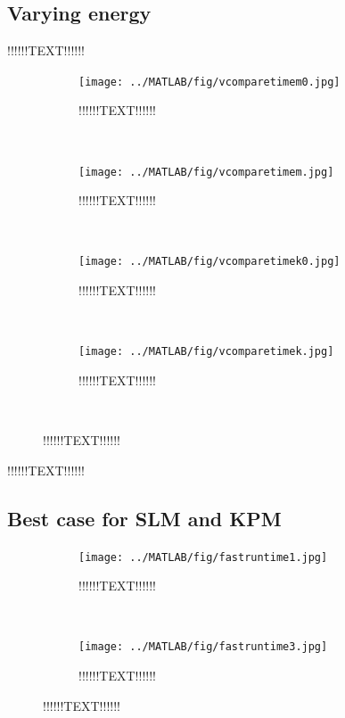 \subsection{Varying energy}%
!!!!!!TEXT!!!!!! \\
\begin{figure}[H]
        \centering
        \begin{subfigure}[b]{0.3\textwidth}
                \texttt{[image: ../MATLAB/fig/vcomparetimem0.jpg]}
                \caption{ !!!!!!TEXT!!!!!! }
                \label{fig:vcomparetimem0}
        \end{subfigure}
        ~
        \begin{subfigure}[b]{0.3\textwidth}
                \texttt{[image: ../MATLAB/fig/vcomparetimem.jpg]}
                \caption{ !!!!!!TEXT!!!!!! }
                \label{fig:vcomparetimem}
        \end{subfigure}
        ~

        
        \begin{subfigure}[b]{0.3\textwidth}
                \texttt{[image: ../MATLAB/fig/vcomparetimek0.jpg]}
                \caption{ !!!!!!TEXT!!!!!! }
                \label{fig:vcomparetimek0}
        \end{subfigure}
        ~
        \begin{subfigure}[b]{0.3\textwidth}
                \texttt{[image: ../MATLAB/fig/vcomparetimek.jpg]}
                \caption{ !!!!!!TEXT!!!!!! }
                \label{fig:vcomparetimek}
        \end{subfigure}
        ~

        \caption{ !!!!!!TEXT!!!!!!}
        \label{fig:vcomparetime}
\end{figure}
!!!!!!TEXT!!!!!! \\

\subsection{Best case for SLM and KPM} %

\begin{figure}[H]
        \centering
        \begin{subfigure}[b]{0.3\textwidth}
                \texttt{[image: ../MATLAB/fig/fastruntime1.jpg]}
                \caption{ !!!!!!TEXT!!!!!! }
                \label{fig:fastruntime1}
        \end{subfigure}
        ~
        \begin{subfigure}[b]{0.3\textwidth}
                \texttt{[image: ../MATLAB/fig/fastruntime3.jpg]}
                \caption{ !!!!!!TEXT!!!!!! }
                \label{fig:fastruntime3}
        \end{subfigure}

        \caption{ !!!!!!TEXT!!!!!!}
        \label{fig:fastruntime}
\end{figure}

